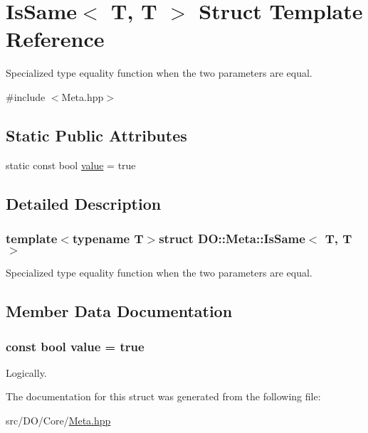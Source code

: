 \hypertarget{struct_d_o_1_1_meta_1_1_is_same_3_01_t_00_01_t_01_4}{\section{Is\-Same$<$ T, T $>$ Struct Template Reference}
\label{struct_d_o_1_1_meta_1_1_is_same_3_01_t_00_01_t_01_4}
}


Specialized type equality function when the two parameters are equal.  




{\ttfamily \#include $<$Meta.\-hpp$>$}

\subsection*{Static Public Attributes}
\begin{DoxyCompactItemize}
\item 
static const bool \hyperlink{struct_d_o_1_1_meta_1_1_is_same_3_01_t_00_01_t_01_4_a11ddd051208250c32dc4985abcafa86d}{value} = true
\end{DoxyCompactItemize}


\subsection{Detailed Description}
\subsubsection*{template$<$typename T$>$struct D\-O\-::\-Meta\-::\-Is\-Same$<$ T, T $>$}

Specialized type equality function when the two parameters are equal. 

\subsection{Member Data Documentation}
\hypertarget{struct_d_o_1_1_meta_1_1_is_same_3_01_t_00_01_t_01_4_a11ddd051208250c32dc4985abcafa86d}{
\subsubsection[{value}]{\setlength{\rightskip}{0pt plus 5cm}const bool value = true\hspace{0.3cm}{\ttfamily [static]}}}\label{struct_d_o_1_1_meta_1_1_is_same_3_01_t_00_01_t_01_4_a11ddd051208250c32dc4985abcafa86d}
Logically. 

The documentation for this struct was generated from the following file\-:\begin{DoxyCompactItemize}
\item 
src/\-D\-O/\-Core/\hyperlink{_meta_8hpp}{Meta.\-hpp}\end{DoxyCompactItemize}
